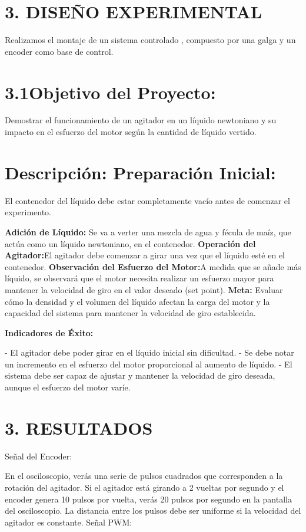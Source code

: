 \documentclass[esp]{ECCI-SIME-class}
\begin{document}
\section{3.	DISEÑO EXPERIMENTAL}
Realizamos el montaje de un sistema controlado , compuesto por una galga y un encoder como base de control. 

\section{3.1Objetivo del Proyecto:}

Demostrar el funcionamiento de un agitador en un líquido newtoniano y su impacto en el esfuerzo del motor según la cantidad de líquido vertido.

\section{Descripción: Preparación Inicial:} El contenedor del líquido debe estar completamente vacío antes de comenzar el experimento.

\textbf{Adición de Líquido:} Se va a verter una mezcla de agua y fécula de maíz, que actúa como un líquido newtoniano, en el contenedor.
\textbf{Operación del Agitador:}El agitador debe comenzar a girar una vez que el líquido esté en el contenedor. 
\textbf{Observación del Esfuerzo del Motor:}A medida que se añade más líquido, se observará que el motor necesita realizar un esfuerzo mayor para mantener la velocidad de giro en el valor deseado (set point).
\textbf{Meta: }Evaluar cómo la densidad y el volumen del líquido afectan la carga del motor y la capacidad del sistema para mantener la velocidad de giro establecida.

\textbf{Indicadores de Éxito:}

- El agitador debe poder girar en el líquido inicial sin dificultad.
- Se debe notar un incremento en el esfuerzo del motor proporcional al aumento de líquido.
- El sistema debe ser capaz de ajustar y mantener la velocidad de giro deseada, aunque el esfuerzo del motor varíe.



\section{3. RESULTADOS }

Señal del Encoder:

En el osciloscopio, verás una serie de pulsos cuadrados que corresponden a la rotación del agitador. Si el agitador está girando a 2 vueltas por segundo y el encoder genera 10 pulsos por vuelta, verás 20 pulsos por segundo en la pantalla del osciloscopio.
La distancia entre los pulsos debe ser uniforme si la velocidad del agitador es constante.
Señal PWM:
\end{document}

